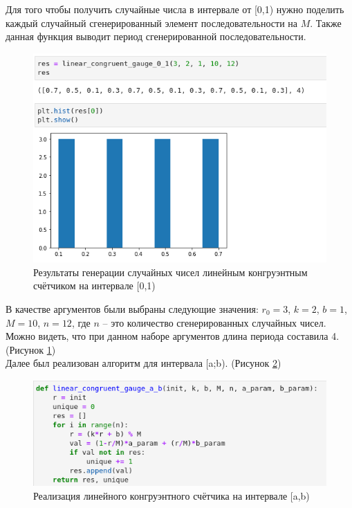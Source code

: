 \documentclass[14pt,fleqn]{extarticle}
\begin{document}
    Для того чтобы получить случайные числа в интервале от [0,1) нужно поделить каждый случайный сгенерированный элемент последовательности на $M$. Также данная функция выводит период сгенерированной последовательности.
    \begin{figure}[h]
        \centering \includegraphics[scale=0.52]{result21}
        \caption{Результаты генерации случайных чисел линейным конгруэнтным счётчиком на интервале [0,1)}
        \label{fig:linear_congruent_gauge_0_1_result}
    \end{figure}
    \newpage
    В качестве аргументов были выбраны следующие значения: $r_0 = 3$, $k = 2$, $b = 1$, $M = 10$, $n = 12$, где $n$ -- это количество сгенерированных случайных чисел. Можно видеть, что при данном наборе аргументов длина периода составила 4. (Рисунок \ref{fig:linear_congruent_gauge_0_1_result})\\
    \newline
    Далее был реализован алгоритм для интервала [a;b). (Рисунок \ref{fig:linear_congruent_gauge_a_b_code})
    \begin{figure}[h]
        \centering \includegraphics[scale=0.6]{code22}
        \caption{Реализация линейного конгруэнтного счётчика на интервале [a,b)}
        \label{fig:linear_congruent_gauge_a_b_code}
    \end{figure}
\end{document}
